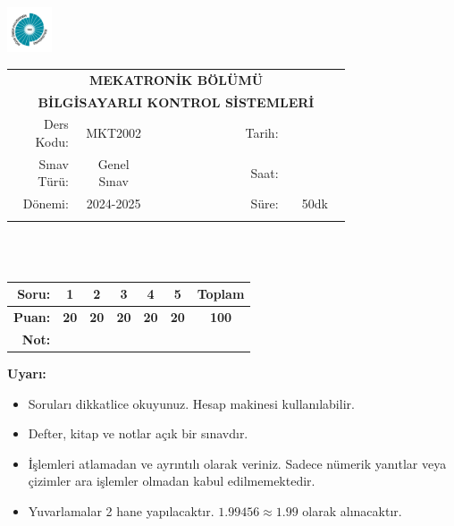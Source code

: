 \newcommand\UniversiteAdi{Niğde Ömer Halisdemir Üniversitesi}
\newcommand\BolumAdi{MEKATRONİK BÖLÜMÜ}
\newcommand\DersKodu{MKT2002}
\newcommand\DersAdi{BİLGİSAYARLI KONTROL SİSTEMLERİ}
\newcommand\SinavAdi{Genel Sınav}
\newcommand\SinavTarihi{ }
\newcommand\SinavSaati{ }
\newcommand\SinavSuresi{50dk}

\pagestyle{fancy}
\fancyhf{} %
\noindent \includegraphics[width=0.1\textwidth]{logo}
\begin{tabular}{
    p{0.15\linewidth}
    p{0.15\linewidth}
    p{0.2\linewidth}
    p{0.1\linewidth}
    p{0.15\linewidth}}
    \multicolumn{5}{c}{\textbf{\BolumAdi}}\\
    \multicolumn{5}{c}{\textbf{\DersAdi}}\\\hline
    \multicolumn{1}{|r|}{Ders Kodu:}&
    \multicolumn{1}{|c|}{\DersKodu}&
    \multicolumn{1}{|c|}{}& 
    \multicolumn{1}{|r|}{Tarih:}&
    \multicolumn{1}{|c|}{\SinavTarihi} \\\hline
    \multicolumn{1}{|r|}{Sınav Türü:}&
    \multicolumn{1}{|c|}{\SinavAdi}&  
    \multicolumn{1}{|c|}{}&
    \multicolumn{1}{|r|}{Saat:}&
    \multicolumn{1}{|c|}{\SinavSaati}\\\hline
    \multicolumn{1}{|r|}{Dönemi:}&
    \multicolumn{1}{|c|}{2024-2025}&
    \multicolumn{1}{|c|}{}&
    \multicolumn{1}{|r|}{Süre:}&
    \multicolumn{1}{|c|}{\SinavSuresi} \\\hline
    &&&&\\
\end{tabular}\\\\
\noindent\begin{center}
\begin{tabular}{|r|c|c|c|c|c|c|}\hline
    \textbf{Soru:}&
    \textbf{1}&
    \textbf{2}&
    \textbf{3}&
    \textbf{4}&
    \textbf{5}&
    \textbf{Toplam}\\\hline
    \textbf{Puan:}&
    \textbf{20}&
    \textbf{20}&
    \textbf{20}&
    \textbf{20}&
    \textbf{20}&
    \textbf{100}\\\hline
    \textbf{Not:}&&&&&&\\\hline
\end{tabular}\end{center}
\noindent\textbf{Uyarı:}
\begin{itemize}\bfseries
    \item Soruları dikkatlice okuyunuz. Hesap makinesi kullanılabilir.
    \item Defter, kitap ve notlar açık bir sınavdır.
    \item İşlemleri atlamadan ve ayrıntılı olarak veriniz. Sadece nümerik yanıtlar veya çizimler ara işlemler olmadan kabul edilmemektedir.
    \item Yuvarlamalar 2 hane yapılacaktır. $\mathbf{1.99456\approx1.99}$ olarak alınacaktır.
\end{itemize}

